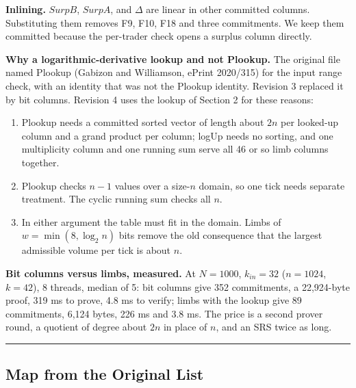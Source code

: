 \textbf{Inlining.} \(SurpB\), \(SurpA\), and \(\Delta\) are linear in other committed columns. Substituting them removes F9, F10, F18 and three commitments. We keep them committed because the per-trader check opens a surplus column directly.

\textbf{Why a logarithmic-derivative lookup and not Plookup.} The original file named Plookup (Gabizon and Williamson, ePrint 2020/315) for the input range check, with an identity that was not the Plookup identity. Revision 3 replaced it by bit columns. Revision 4 uses the lookup of Section 2 for these reasons:

\begin{enumerate}
\def\labelenumi{\arabic{enumi}.}
\item
  Plookup needs a committed sorted vector of length about \(2n\) per looked-up column and a grand product per column; logUp needs no sorting, and one multiplicity column and one running sum serve all 46 or so limb columns together.
\item
  Plookup checks \(n-1\) values over a size-\(n\) domain, so one tick needs separate treatment. The cyclic running sum checks all \(n\).
\item
  In either argument the table must fit in the domain. Limbs of \(w = \min(8, \log_2 n)\) bits remove the old consequence that the largest admissible volume per tick is about \(n\).
\end{enumerate}

\textbf{Bit columns versus limbs, measured.} At \(N = 1000\), \(k_{in} = 32\) (\(n = 1024\), \(k = 42\)), 8 threads, median of 5: bit columns give 352 commitments, a 22,924-byte proof, 319 ms to prove, 4.8 ms to verify; limbs with the lookup give 89 commitments, 6,124 bytes, 226 ms and 3.8 ms. The price is a second prover round, a quotient of degree about \(2n\) in place of \(n\), and an SRS twice as long.

\begin{center}\rule{0.5\linewidth}{0.5pt}\end{center}

\subsection{Map from the Original List}

